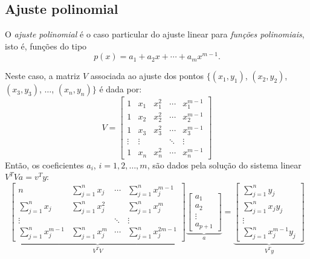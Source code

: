 \subsection{Ajuste polinomial}

O \emph{ajuste polinomial} é o caso particular do ajuste linear para \emph{funções polinomiais}, isto é, funções do tipo 
\begin{equation*}
  p(x)=a_1 + a_2 x + \cdots + a_{m}x^{m-1}.
\end{equation*}

Neste caso, a matriz $V$ associada ao ajuste dos pontos $\{(x_1, y_1)$, $(x_2, y_2)$, $(x_3, y_3)$, $\ldots$, $(x_n,y_n)\}$ é dada por:
\begin{equation*}
  V=
\begin{bmatrix}
  1     &    x_1   &   x_1^2& \cdots & x_1^{m-1}\\
  1     &    x_2   &   x_2^2& \cdots & x_2^{m-1}\\
  1     &    x_3   &   x_3^2& \cdots & x_3^{m-1}\\
  \vdots&    \vdots&  & \ddots & \vdots    \\
  1     &    x_n   &   x_n^2& \cdots & x_n^{m-1}
\end{bmatrix}
\end{equation*}
Então, os coeficientes $a_i$, $i = 1, 2, \ldots, m$, são dados pela solução do sistema linear $V^TV a = v^Ty$:
\begin{equation*}
  \underbrace{\begin{bmatrix}
     n     &  \sum\limits_{j=1}^n  x_j   & \cdots & \sum\limits_{j=1}^n x_j^{m-1}\\
     \sum\limits_{j=1}^n x_j   &  \sum\limits_{j=1}^n  x_j^2 &        & \sum\limits_{j=1}^n x_j^{m}\\
     \vdots     &              & \ddots & \vdots    \\
     \sum\limits_{j=1}^n x_j^{m-1} &  \sum\limits_{j=1}^n  x_j^{m} & \cdots & \sum\limits_{j=1}^n x_j^{2m-1}
  \end{bmatrix}}_{V^TV}
  \underbrace{\begin{bmatrix}
     a_1 \\
     a_2 \\
     \vdots \\
     a_{p+1}
  \end{bmatrix}}_{a}=
  \underbrace{\begin{bmatrix}
     \sum\limits_{j=1}^n y_j \\
     \sum\limits_{j=1}^n x_j y_j \\
     \vdots \\
     \sum\limits_{j=1}^n x_j^{m-1} y_j 
  \end{bmatrix}}_{V^Ty}
\end{equation*}

